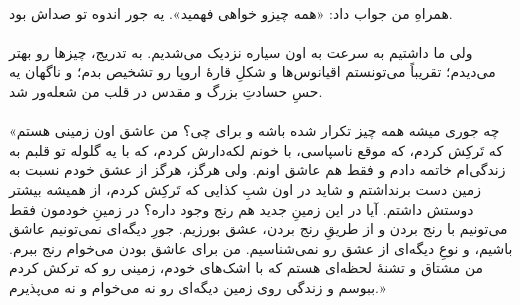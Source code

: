 \documentclass[12pt]{book}
\begin{document}
    \paragraph{}
    همراهِ من جواب داد: «همه چیزو خواهی فهمید». یه جور اندوه تو صداش بود.

    \paragraph{}
    ولی ما داشتیم به سرعت به اون سیاره نزدیک می‌شدیم. به تدریج، چیزها رو بهتر می‌دیدم؛ تقریباً می‌تونستم اقیانوس‌ها و  شکلِ قارهٔ اروپا رو تشخیص بدم؛ و ناگهان یه حسِ حسادتِ بزرگ و مقدس در قلب من شعله‌ور شد.

    \paragraph{}
    «چه جوری میشه همه چیز تکرار شده باشه و برای چی؟ من عاشق اون زمینی هستم که تَرکِش کردم، که موقع ناسپاسی، با خونم لکه‌دارش کردم، که با یه گلوله تو قلبم به زندگی‌ام خاتمه دادم و فقط هم عاشق اونم. ولی هرگز، هرگز از عشق خودم نسبت به زمین دست برنداشتم و شاید در اون شبِ کذایی که تَرکِش کردم، از همیشه بیشتر دوستش داشتم. آیا در این زمینِ جدید هم رنج وجود داره؟ در زمینِ خودمون فقط می‌تونیم با رنج بردن و از طریقِ رنج بردن، عشق بورزیم. جورِ دیگه‌ای نمی‌تونیم عاشق باشیم، و نوعِ دیگه‌ای از عشق رو نمی‌شناسیم. من برای عاشق بودن می‌خوام رنج ببرم. من مشتاق و تشنهٔ لحظه‌ای هستم که با اشک‌های خودم، زمینی رو که ترکش کردم ببوسم و زندگی روی زمین دیگه‌ای رو نه می‌خوام و نه می‌پذیرم.»
\end{document}
